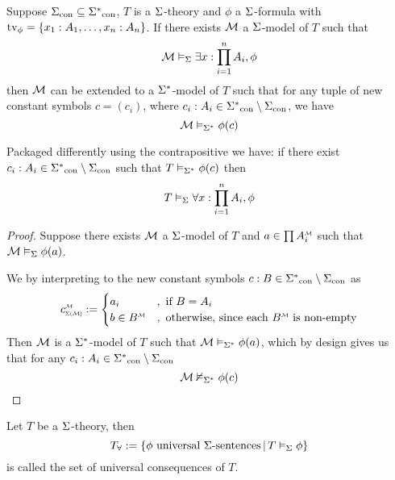 \begin{lem}
    Suppose ${\Sigma}_\mathrm{con} \subseteq {\Sigma^*}_\mathrm{con}$, 
    $T$ is a $\Sigma$-theory and $\phi$ a $\Sigma$-formula
    with $\textrm{tv}_{\phi} = \left\{x_1 : A_1, \dots, x_n : A_n\right\}$.
    If there exists $\mathcal{M}$ a $\Sigma$-model of $T$ such that 
    \[\mathcal{M} \vDash_{\Sigma} \exists x : \prod_{i = 1}^n A_i, \phi\]
    then $\mathcal{M}$ can be extended to a $\Sigma^*$-model of $T$ such that 
    for any tuple of new constant symbols $c = (c_i)$, where
    $c_i : A_i \in {\Sigma^*}_\mathrm{con} \setminus {\Sigma}_\mathrm{con}$, we have
    \[\mathcal{M} \vDash_{\Sigma^*} \phi(c)\]

    Packaged differently using the contrapositive we have:
    if there exist
    $c_i : A_i \in {\Sigma^*}_\mathrm{con} \setminus {\Sigma}_\mathrm{con}$
    such that
    $T \vDash_{\Sigma^*} \phi(c)$ then 
    \[
        T \vDash_{\Sigma} \forall x : \prod_{i = 1}^n A_i, \phi
    \]
\end{lem}
\begin{proof}
    Suppose there exists $\mathcal{M}$ a $\Sigma$-model of $T$
    and $a \in \prod \mmintp{A_i}$
    such that $\mathcal{M} \vDash_{\Sigma} \phi(a)$.

    We 
    by interpreting
    to the new constant symbols 
    $c : B \in {\Sigma^*}_\mathrm{con} \setminus {\Sigma}_\mathrm{con}$ as
    \[
        \subintp{\Si(\MM)}{\MM}{c} := 
        \begin{cases}
            a_i &, \text{ if } B = A_i\\
            b \in \mmintp{B}&, 
            \text{ otherwise, since each $\mmintp{B}$ is non-empty} 
        \end{cases}
    \]
    Then $\mathcal{M}$ is a $\Sigma^*$-model of $T$ such that 
    $\mathcal{M} \vDash_{\Sigma^*} \phi(a)$, 
    which by design gives us that for any 
    $c_i : A_i \in {\Sigma^*}_\mathrm{con} \setminus {\Sigma}_\mathrm{con}$
    \[\mathcal{M} \nvDash_{\Sigma^*} \phi(c)\]
\end{proof}

\begin{nttn}
    Let $T$ be a $\Sigma$-theory, then 
    \[
        T_\forall := 
        \left\{\phi \text{ universal $\Sigma$-sentences} \,|\, T \vDash_{\Sigma} \phi\right\}
    \]
    is called the set of universal consequences of $T$.
\end{nttn}

